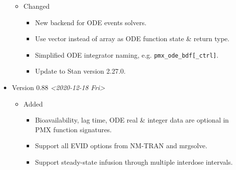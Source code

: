\documentclass[12pt, reqno, oneside]{amsbook}
\numberwithin{equation}{chapter}
\numberwithin{figure}{chapter}
\numberwithin{table}{chapter}
\theoremstyle{remark}
\begin{document}
\begin{itemize}
\begin{itemize}
\item Changed
\begin{itemize}
\item New backend for ODE events solvers.
\item Use vector instead of array as ODE function state \& return type.
\item Simplified ODE integrator naming, e.g. \texttt{pmx\_ode\_bdf[\_ctrl]}.
\item Update to Stan version 2.27.0.
\end{itemize}
\end{itemize}
\item Version 0.88 \textit{<2020-12-18 Fri>}
\begin{itemize}
\item Added
\begin{itemize}
\item Bioavailability, lag time, ODE real \& integer data are optional in PMX function signatures.
\item Support all EVID options from NM-TRAN and mrgsolve.
\item Support steady-state infusion through multiple interdose intervals.
\end{itemize}
\end{itemize}


\end{itemize}
\end{document}

